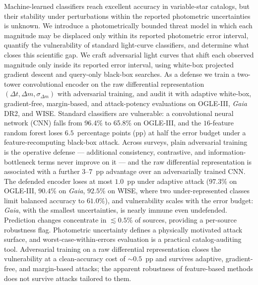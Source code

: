 \documentclass{aa}
\begin{document}
\abstract
  {Machine-learned classifiers reach excellent accuracy in variable-star catalogs, but their stability under perturbations within the reported photometric uncertainties is unknown.}
  {We introduce a photometrically bounded threat model in which each magnitude may be displaced only within its reported photometric error interval, quantify the vulnerability of standard light-curve classifiers, and determine what closes this scientific gap.}
  {We craft adversarial light curves that shift each observed magnitude only inside its reported error interval, using white-box projected gradient descent and query-only black-box searches. As a defense we train a two-tower convolutional encoder on the raw differential representation $(\Delta t, \Delta m, \sigma_{\Delta m})$ with adversarial training, and audit it with adaptive white-box, gradient-free, margin-based, and attack-potency evaluations on OGLE-III, \textit{Gaia} DR2, and WISE.}
  {Standard classifiers are vulnerable: a convolutional neural network (CNN) falls from 96.4\% to 65.8\% on OGLE-III, and the $16$-feature random forest loses $6.5$~percentage points (pp) at half the error budget under a feature-recomputing black-box attack. Across surveys, plain adversarial training is the operative defense --- additional consistency, contrastive, and information-bottleneck terms never improve on it --- and the raw differential representation is associated with a further $3$--$7$~pp advantage over an adversarially trained CNN. The defended encoder loses at most $1.0$~pp under adaptive attack ($97.3\%$ on OGLE-III, $90.4\%$ on \textit{Gaia}, $92.5\%$ on WISE, where two under-represented classes limit balanced accuracy to $61.0\%$), and vulnerability scales with the error budget: \textit{Gaia}, with the smallest uncertainties, is nearly immune even undefended. Prediction changes concentrate in $\lesssim 0.5\%$ of sources, providing a per-source robustness flag.}
  {Photometric uncertainty defines a physically motivated attack surface, and worst-case-within-errors evaluation is a practical catalog-auditing tool. Adversarial training on a raw differential representation closes the vulnerability at a clean-accuracy cost of ${\sim}0.5$~pp and survives adaptive, gradient-free, and margin-based attacks; the apparent robustness of feature-based methods does not survive attacks tailored to them.}

\end{document}
